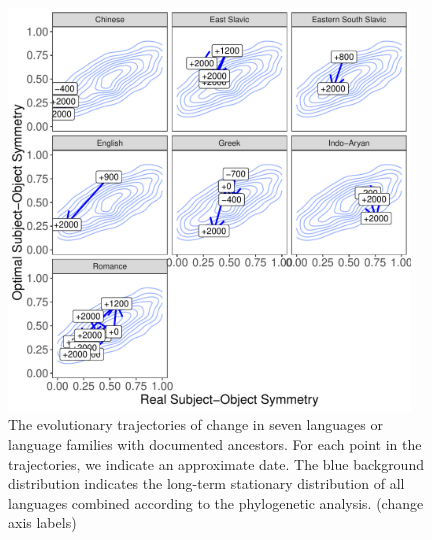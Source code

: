 \documentclass[11pt,a4paper]{article}
\newcommand\comment[1]{{\color{red}#1}}
\newcommand\mhahn[1]{{\color{red}(#1)}}
\begin{document}
\begin{figure}
    \centering
    \includegraphics[width=0.95\textwidth]{../analysis/figures/historical_2.6_times_stationary.pdf}
    \caption{The evolutionary trajectories of change in seven languages or language families with documented ancestors. For each point in the trajectories, we indicate an approximate date. The blue background distribution indicates the long-term stationary distribution of all languages combined according to the phylogenetic analysis. \mhahn{change axis labels}}
    \label{fig:historical}
\end{figure}





\end{document}
